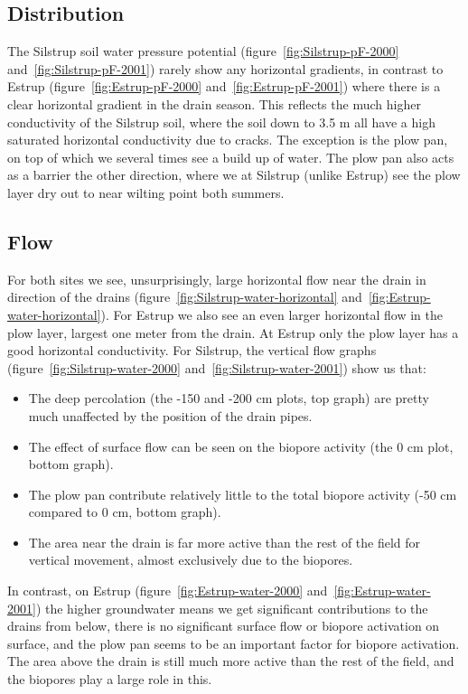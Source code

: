 \subsection{Distribution}

The Silstrup soil water pressure potential
(figure~\ref{fig:Silstrup-pF-2000} and~\ref{fig:Silstrup-pF-2001})
rarely show any horizontal gradients, in contrast to Estrup
(figure~\ref{fig:Estrup-pF-2000} and~\ref{fig:Estrup-pF-2001}) where
there is a clear horizontal gradient in the drain season.  This
reflects the much higher conductivity of the Silstrup soil, where the
soil down to 3.5 m all have a high saturated horizontal conductivity
due to cracks.  The exception is the plow pan, on top of which we
several times see a build up of water.  The plow pan also acts as a
barrier the other direction, where we at Silstrup (unlike Estrup) see
the plow layer dry out to near wilting point both summers.

\subsection{Flow}

For both sites we see, unsurprisingly, large horizontal flow near the
drain in direction of the drains
(figure~\ref{fig:Silstrup-water-horizontal}
and~\ref{fig:Estrup-water-horizontal}).  For Estrup we also see an
even larger horizontal flow in the plow layer, largest one meter from
the drain.  At Estrup only the plow layer has a good horizontal
conductivity.  For Silstrup, the vertical flow graphs
(figure~\ref{fig:Silstrup-water-2000}
and~\ref{fig:Silstrup-water-2001}) show us that:
\begin{itemize}
\item The deep percolation (the -150 and -200 cm plots, top graph) are
  pretty much unaffected by the position of the drain pipes.
\item The effect of surface flow can be seen on the biopore activity
  (the 0 cm plot, bottom graph).
\item The plow pan contribute relatively little to the total biopore
  activity (-50 cm compared to 0 cm, bottom graph).
\item The area near the drain is far more active than the rest of the
  field for vertical movement, almost exclusively due to the biopores.
\end{itemize}

In contrast, on Estrup (figure~\ref{fig:Estrup-water-2000}
and~\ref{fig:Estrup-water-2001}) the higher groundwater means we get
significant contributions to the drains from below, there is no
significant surface flow or biopore activation on surface, and the
plow pan seems to be an important factor for biopore activation.  The
area above the drain is still much more active than the rest of the
field, and the biopores play a large role in this.

